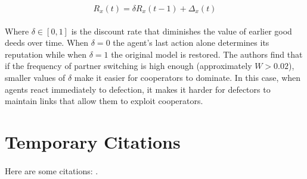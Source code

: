 \documentclass{article}
\begin{document}
	\begin{equation}
	R_x(t)=\delta R_x(t-1)+\Delta_x(t)
	\end{equation}

	\paragraph{}Where $\delta\in[0,1]$ is the discount rate that diminishes the value of earlier good deeds over time.  When $\delta=0$ the agent’s last action alone determines its reputation while when $\delta=1$ the original model is restored.  The authors find that if the frequency of partner switching is high enough (approximately $W>0.02$), smaller values of $\delta$ make it easier for cooperators to dominate.  In this case, when agents react immediately to defection, it makes it harder for defectors to maintain links that allow them to exploit cooperators.
	
    \section{Temporary Citations}
    \paragraph{}Here are some citations: \cite{Axelrod1981}\cite{Nowak1992}\cite{Hauert2004}\cite{Pacheco2005}\cite{Santos2006b}\cite{Santos2006a}\cite{Santos2005a}\cite{Santos2006c}\cite{Santos2005b}\cite{Eguiluz2005}\cite{Santos2006d}\cite{Fu2008}\cite{Traulsen2006}\cite{Watts1998}\cite{Barabasi1999}\cite{Amaral2000}\cite{Molloy1995}\cite{Maslov2002}\cite{Dorogovtsev2003}\cite{Dorogovtsev2001}\cite{Nowak1998}\cite{Boyd1988}\cite{Boyd1992}\cite{Hauert2002}\cite{Hauert2007}\cite{Li2014}\cite{Maloney2015a}\cite{Ohtsuki2006}\cite{Macy1991}.
    
    
    
\end{document}
